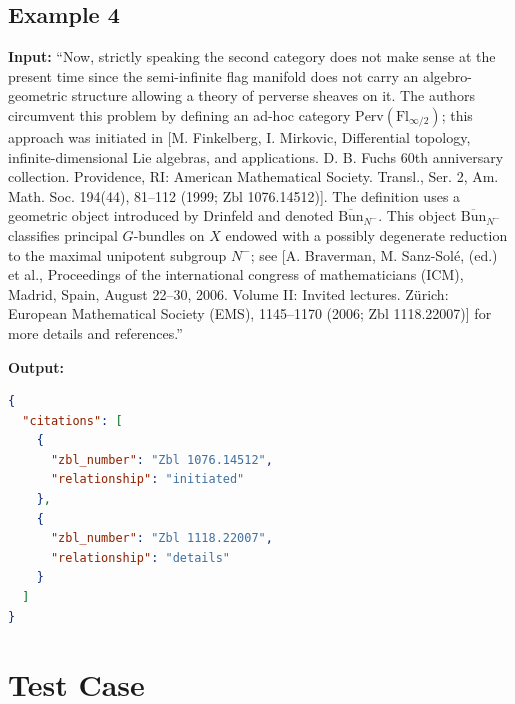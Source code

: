 \documentclass[sigconf,anonymous]{acmart}
\begin{document}
\subsection*{Example 4}

\textbf{Input:} ``Now, strictly speaking the second category does not make sense at the present time since the semi-infinite flag manifold does not carry an algebro-geometric structure allowing a theory of perverse sheaves on it. The authors circumvent this problem by defining an ad-hoc category $\text{Perv}(\text{Fl}_{\infty/2})$; this approach was initiated in [M. Finkelberg, I. Mirkovic, Differential topology, infinite-dimensional Lie algebras, and applications. D. B. Fuchs 60th anniversary collection. Providence, RI: American Mathematical Society. Transl., Ser. 2, Am. Math. Soc. 194(44), 81–112 (1999; Zbl 1076.14512)]. The definition uses a geometric object introduced by Drinfeld and denoted $\overline{\text{Bun}}_{N^-}$. This object $\overline{\text{Bun}}_{N^-}$ classifies principal $G$-bundles on $X$ endowed with a possibly degenerate reduction to the maximal unipotent subgroup $N^-$; see [A. Braverman, M. Sanz-Solé, (ed.) et al., Proceedings of the international congress of mathematicians (ICM), Madrid, Spain, August 22–30, 2006. Volume II: Invited lectures. Zürich: European Mathematical Society (EMS), 1145–1170 (2006; Zbl 1118.22007)] for more details and references.''

\textbf{Output:}
\begin{lstlisting}[language=json]
{
  "citations": [
    {
      "zbl_number": "Zbl 1076.14512",
      "relationship": "initiated"
    },
    {
      "zbl_number": "Zbl 1118.22007",
      "relationship": "details"
    }
  ]
}
\end{lstlisting}

\section*{Test Case}
\end{document}
